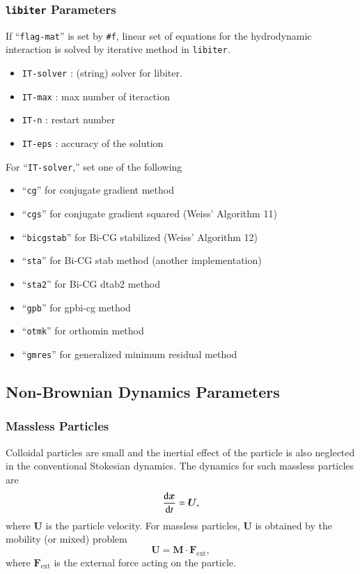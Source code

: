 \documentclass{book}
\begin{document}
\subsubsection{{\tt libiter} Parameters}
If ``{\tt flag-mat}'' is set by {\tt \#f}, linear set of equations 
for the hydrodynamic interaction is solved by iterative method 
in {\tt libiter}. 
\begin{itemize}
\item {\tt IT-solver} : (string) solver for libiter.
\item {\tt IT-max} : max number of iteraction
\item {\tt IT-n}   : restart number
\item {\tt IT-eps} : accuracy of the solution
\end{itemize}
For ``{\tt IT-solver},'' set one of the following
\begin{itemize}
\item ``{\tt cg}'' for conjugate gradient method
\item ``{\tt cgs}'' for conjugate gradient squared (Weiss' Algorithm 11)
\item ``{\tt bicgstab}'' for Bi-CG stabilized (Weiss' Algorithm 12)
\item ``{\tt sta}'' for Bi-CG stab method (another implementation)
\item ``{\tt sta2}'' for Bi-CG dtab2 method
\item ``{\tt gpb}'' for gpbi-cg method
\item ``{\tt otmk}'' for orthomin method
\item ``{\tt gmres}'' for generalized minimum residual method
\end{itemize}


\subsection{Non-Brownian Dynamics Parameters}
\subsubsection{Massless Particles}
Colloidal particles are small and the inertial effect of the particle 
is also neglected in the conventional Stokesian dynamics.
The dynamics for such massless particles are
\begin{equation}
  \frac{{\rm d}\bm{x}}{{\rm d}t}
  =
  \bm{U}
  ,
\end{equation}
where $\bm{U}$ is the particle velocity.
For massless particles, $\bm{U}$ is obtained
by the mobility (or mixed) problem
\begin{equation}
  \bm{U}
  =
  \bm{M}\cdot\bm{F}_{\text{ext}}
  ,
\end{equation}
where $\bm{F}_{\text{ext}}$ is the external force acting on the particle.
\end{document}
